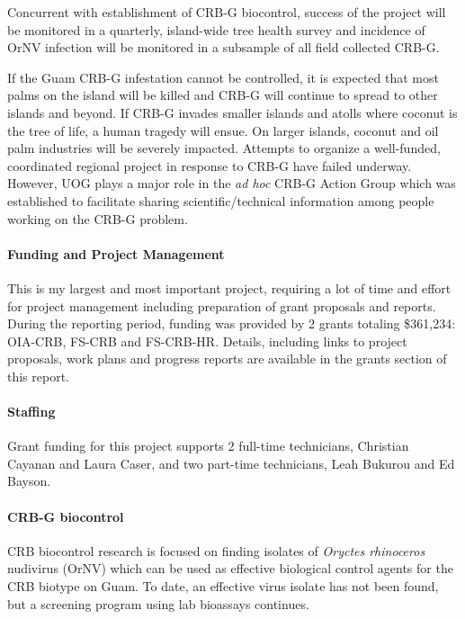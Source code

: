 \begin{refsection}
Concurrent with establishment of CRB-G biocontrol, success of the
project will be monitored in a quarterly, island-wide tree health
survey and incidence of OrNV infection will be monitored in a subsample
of all field collected CRB-G.

If the Guam CRB-G infestation cannot be controlled, it is expected
that most palms on the island will be killed and CRB-G will continue
to spread to other islands and beyond. If CRB-G invades smaller islands
and atolls where coconut is the tree of life, a human tragedy will
ensue. On larger islands, coconut and oil palm industries will be
severely impacted. Attempts to organize a well-funded, coordinated regional project in response to CRB-G have failed underway. However, UOG plays a major role in the \textit{ad hoc} CRB-G Action Group which was established to facilitate sharing scientific/technical information among people working on the CRB-G problem.

\paragraph{Funding and Project Management} This is my largest and most important project, requiring a lot of time and effort for project management including preparation of grant proposals and reports. During the reporting period, funding was provided by 2 grants totaling \$361,234: OIA-CRB, FS-CRB and FS-CRB-HR.  Details, including links to project proposals, work plans and progress reports are available in the grants section of this report.

\paragraph{Staffing}

Grant funding for this project supports 2 full-time technicians, Christian Cayanan and Laura Caser, and two part-time technicians, Leah Bukurou and Ed Bayson.

\paragraph{CRB-G biocontrol} 

CRB biocontrol research is focused on finding isolates of \textit{Oryctes rhinoceros} nudivirus (OrNV) which can be used as effective biological control agents for the CRB biotype on Guam. To date, an effective virus isolate has not been found, but a screening program using lab bioassays continues. 


\end{refsection}

